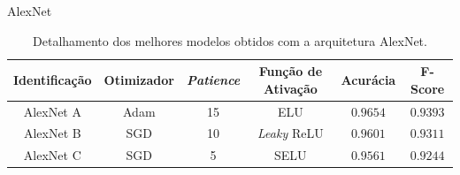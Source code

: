 \begin{frame}{AlexNet}

  \begin{table}[h!]
\centering
\caption{Detalhamento dos melhores modelos obtidos com a arquitetura AlexNet.}
\label{tab:alexnet}
\begin{tabular}{cccccc}
\toprule
\textbf{Identificação} & \textbf{Otimizador} & \textbf{\emph{Patience}}  & \textbf{Função de Ativação} & \textbf{Acurácia} & \textbf{F-Score} \\
\midrule
AlexNet A & Adam & 15 & ELU & $0.9654$ & $0.9393$ \\
AlexNet B & SGD & 10 & \emph{Leaky} ReLU & $0.9601$ & $0.9311$ \\
AlexNet C & SGD & 5 & SELU & $0.9561$ & $0.9244$ \\
\bottomrule
\end{tabular}
\end{table}

\end{frame}

